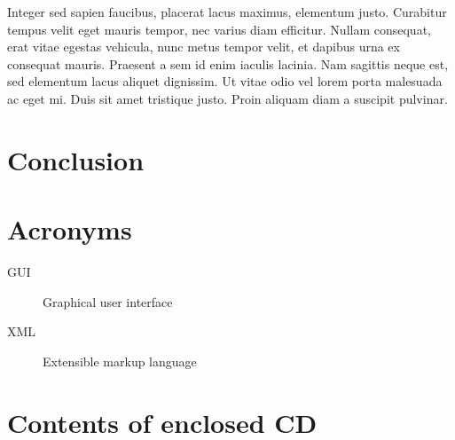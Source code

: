 \documentclass[thesis=B,english]{FITthesis}[2012/10/20]
\begin{document}
Integer sed sapien faucibus, placerat lacus maximus, elementum justo. Curabitur tempus velit eget mauris tempor, nec varius diam efficitur. Nullam consequat, erat vitae egestas vehicula, nunc metus tempor velit, et dapibus urna ex consequat mauris. Praesent a sem id enim iaculis lacinia. Nam sagittis neque est, sed elementum lacus aliquet dignissim. Ut vitae odio vel lorem porta malesuada ac eget mi. Duis sit amet tristique justo. Proin aliquam diam a suscipit pulvinar.


\chapter{Conclusion}





\appendix

\chapter{Acronyms}
\begin{description}
	\item[GUI] Graphical user interface
	\item[XML] Extensible markup language
\end{description}


\chapter{Contents of enclosed CD}


\begin{figure}
\end{figure}
\end{document}
